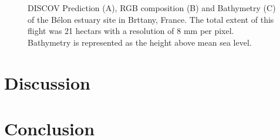 \documentclass[
  letterpaper,
  DIV=11,
  numbers=noendperiod]{scrartcl}
\begin{document}
\label{cell-fig-Belon}
\begin{figure}[H]


\caption{\label{fig-Belon}DISCOV Prediction (A), RGB composition (B) and
Bathymetry (C) of the Bélon estuary site in Brttany, France. The total
extent of this flight was 21 hectars with a resolution of 8 mm per
pixel. Bathymetry is represented as the height above mean sea level.}

\end{figure}%

\section{Discussion}\label{discussion}

\section{Conclusion}\label{conclusion}
\end{document}
